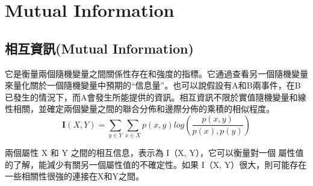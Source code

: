 \chapter{Mutual Information}
\label{chapter:intro}
\section{相互資訊(Mutual Information)}
它是衡量兩個隨機變量之間關係性存在和強度的指標。它通過查看另一個隨機變量來量化關於一個隨機變量中預期的“信息量”。也可以說假設有A和B兩事件，在B已發生的情況下，而A會發生所能提供的資訊。相互資訊不限於實值隨機變量和線性相關，並確定兩個變量之間的聯合分佈和邊際分佈的乘積的相似程度。
\begin{equation}
\label{equ:mi}
    \textbf{I}(X,Y)=\sum_{y\in Y}^{}\sum_{x\in X}^{}p(x,y)log(\frac{p(x,y)}{p(x),p(y)})
\end{equation}

        兩個屬性 X 和 Y 之間的相互信息，表示為 I（X, Y），它可以衡量對一個 屬性值的了解，能減少有關另一個屬性值的不確定性。如果 I（X, Y）很大，則可能存在一些相關性很強的連接在X和Y之間。



